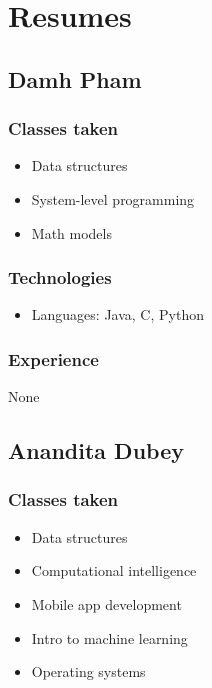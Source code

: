 \documentclass[
10pt, %
letterpaper, %
oneside, %
headinclude,footinclude, %
BCOR5mm, %
]{scrartcl}
\begin{document}
\section{Resumes}

\subsection{Damh Pham}

\subsubsection{Classes taken}

\begin{itemize}
\item
  Data structures
\item
  System-level programming
\item
  Math models
\end{itemize}

\subsubsection{Technologies}

\begin{itemize}
\item
  Languages: Java, C, Python
\end{itemize}

\subsubsection{Experience}

None

\subsection{Anandita Dubey}

\subsubsection{Classes taken}

\begin{itemize}
\item
  Data structures
\item
  Computational intelligence
\item
  Mobile app development
\item
  Intro to machine learning
\item
  Operating systems
\end{itemize}
\end{document}
